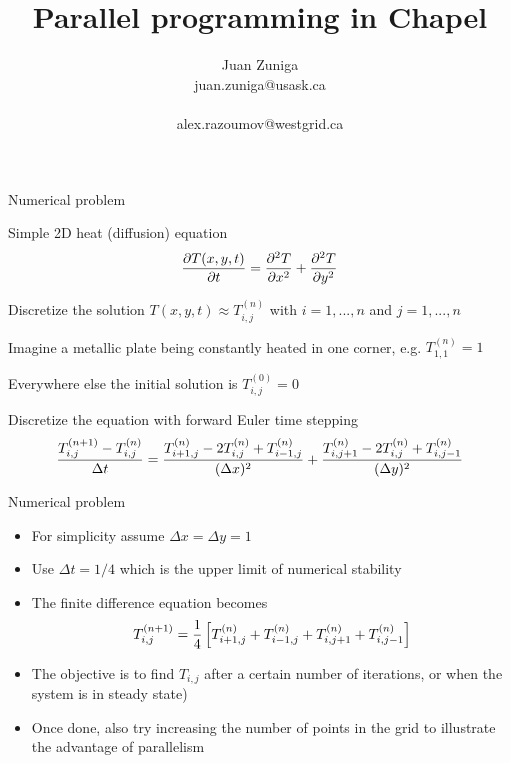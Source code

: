 \documentclass[xcolor=svgnames,aspectratio=169]{beamer}
\begin{document}
\title[Chapel workshop]{\LARGE Parallel programming in Chapel}
\author[]{{\large\sc Juan Zuniga}\\{\small juan.zuniga@usask.ca}\\\\{\small alex.razoumov@westgrid.ca}}
\date[July 2017]{}

\begin{frame}
  \titlepage
\end{frame}

\newcommand{\tnij}{\ensuremath{T^{(n)}_{i,j}}}

\begin{frame}{Numerical problem}
  \begin{itemize}\setlength{\itemsep}{3mm}
    \item Simple 2D heat (diffusion) equation
    \[
      {\partial T(x,y,t)\over\partial t}={\partial^2 T\over\partial x^2}+{\partial^2 T\over\partial y^2}
    \]
    {\footnotesize
      \item Discretize the solution $T(x,y,t)\approx T^{(n)}_{i,j}$ with $i=1,...,n$ and $j=1,...,n$
      \item Imagine a metallic plate being constantly heated in one corner, e.g. $T^{(n)}_{1,1}=1$
      \item Everywhere else the initial solution is $T^{(0)}_{i,j}=0$}
    \item Discretize the equation with forward Euler time stepping
    \[
      {T^{(n+1)}_{i,j}-\tnij\over\Delta t}=
      {T^{(n)}_{i+1,j}-2T^{(n)}_{i,j}+T^{(n)}_{i-1,j}\over(\Delta x)^2}+
      {T^{(n)}_{i,j+1}-2T^{(n)}_{i,j}+T^{(n)}_{i,j-1}\over(\Delta y)^2}
    \]
  \end{itemize}
\end{frame}

\begin{frame}{Numerical problem}
  \begin{itemize}\setlength{\itemsep}{3mm}
    \item For simplicity assume $\Delta x=\Delta y=1$
    \item Use $\Delta t=1/4$ which is the upper limit of numerical stability
    \item The finite difference equation becomes
    \[
      T^{(n+1)}_{i,j} = {1\over4}\left[T^{(n)}_{i+1,j}+T^{(n)}_{i-1,j}+T^{(n)}_{i,j+1}+T^{(n)}_{i,j-1}\right]
    \]
    \item The objective is to find $T_{i,j}$ after a
    certain number of iterations, or when the system is in steady state)
    \item Once done, also try increasing the number of points in the grid to illustrate the advantage of
    parallelism
  \end{itemize}
\end{frame}
\end{document}

